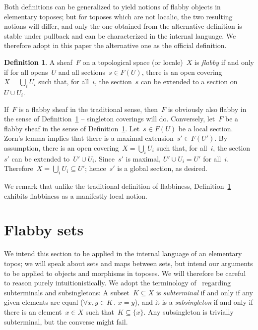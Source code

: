 \documentclass[oneside]{amsart}
\theoremstyle{definition}
\newtheorem{defn}{Definition}[section]
\theoremstyle{plain}
\theoremstyle{remark}
\renewcommand{\_}{\mathpunct{.}\,}
\begin{document}
Both definitions can be generalized to yield notions of flabby objects in
elementary toposes; but for toposes which are not localic, the two resulting
notions will differ, and only the one obtained from the alternative definition
is stable under pullback and
can be characterized in the internal language. We therefore adopt in this paper the
alternative one as the official definition.

\begin{defn}\label{defn:flabby-sheaf}
A sheaf~$F$ on a topological space (or locale)~$X$ is \emph{flabby}
if and only if for all opens~$U$ and all sections~$s \in F(U)$, there is an
open covering~$X = \bigcup_i U_i$ such that, for all~$i$, the section~$s$ can
be extended to a section on~$U \cup U_i$.\end{defn}

If~$F$ is a flabby sheaf in the traditional sense, then~$F$ is obviously also
flabby in the sense of Definition~\ref{defn:flabby-sheaf} -- singleton
coverings will do. Conversely, let~$F$ be a flabby sheaf in the sense of
Definition~\ref{defn:flabby-sheaf}. Let~$s \in F(U)$ be a local section. Zorn's
lemma implies that there is a maximal extension~$s' \in F(U')$. By assumption,
there is an open covering~$X = \bigcup_i U_i$ such that, for all~$i$, the
section~$s'$ can be extended to~$U' \cup U_i$. Since~$s'$ is maximal, $U' \cup
U_i = U'$ for all~$i$. Therefore~$X = \bigcup_i U_i \subseteq U'$; hence~$s'$ is a
global section, as desired.

We remark that unlike the traditional definition of flabbiness,
Definition~\ref{defn:flabby-sheaf} exhibits flabbiness as a manifestly local
notion.


\section{Flabby sets}\label{sect:flabby-sets}

We intend this section to be applied in the internal language of an elementary
topos; we will speak about sets and maps between sets, but intend our arguments
to be applied to objects and morphisms in toposes. We will therefore be careful
to reason purely intuitionistically. We
adopt the terminology of~\cite{kock:partial-maps} regarding subterminals and
subsingletons: A subset~$K \subseteq X$ is \emph{subterminal} if and only if any given
elements are equal ($\forall x,y \in K\_ x = y$), and it is a
\emph{subsingleton} if and only if there is an element~$x \in X$ such that~$K
\subseteq \{ x \}$. Any subsingleton is trivially subterminal, but the converse
might fail.
\end{document}
